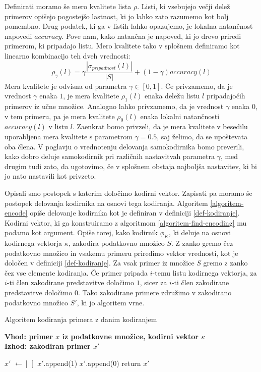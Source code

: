 \documentclass[12pt,a4paper,twoside]{article}
\theoremstyle{definition} %
\theoremstyle{plain} %
\numberwithin{equation}{section}  %
\begin{document}
Definirati moramo še mero kvalitete lista $\rho$. 
Listi, ki vsebujejo večji delež primerov opišejo pogostejšo lastnost, ki jo lahko zato razumemo kot bolj pomembno. 
Drug podatek, ki ga v listih lahko opazujemo, je lokalna natančnost napovedi $\mathit{accuracy}$.
Pove nam, kako natančna je napoved, ki jo drevo priredi primerom, ki pripadajo listu.
Mero kvalitete tako v splošnem definiramo kot linearno kombinacijo teh dveh vrednosti:
\[
\rho_{\gamma}(l) = \gamma \frac{|\sigma_{\mathit{pripadnost}}(l)|}{|S|} + (1-\gamma) \mathit{accuracy}(l)
\]
\label{mera-kvalitete}
Mera kvalitete je odvisna od parametra $\gamma \in [0,1]$.
Če privzamemo, da je vrednost $\gamma$ enaka $1$, je mera kvalitete $\rho_1(l)$ enaka deležu listu $l$ pripadajočih primerov iz učne množice.
Analogno lahko privzamemo, da je vrednost $\gamma$ enaka $0$, v tem primeru, pa je mera kvalitete $\rho_0(l)$ enaka lokalni natančnosti $\mathit{accuracy}(l)$ v listu $l$.
Zaenkrat bomo privzeli, da je mera kvalitete v besedilu uporabljena mera kvalitete s parametrom $\gamma=0.5$, saj želimo, da se upoštevata oba člena.
V poglavju o vrednotenju delovanja samokodirnika bomo preverili, kako dobro deluje samokodirnik pri različnih nastavitvah parametra $\gamma$,
med drugim tudi zato, da ugotovimo, če v splošnem obstaja najboljša nastavitev, ki bi jo nato nastavili kot privzeto.

Opisali smo postopek s katerim določimo kodirni vektor. Zapisati pa moramo še postopek delovanja kodirnika na osnovi tega kodiranja.
Algoritem \ref{algoritem-encode} opiše delovanje kodirnika kot je definiran v definiciji \ref{def-kodiranje}. 
Kodirni vektor, ki ga konstruiramo z algoritmom \ref{algoritem-find-encoding} mu podamo kot argument.
Opiše torej, kako kodirnik $\phi_K$, ki deluje na osnovi kodirnega vektorja $\kappa$, zakodira podatkovno množico $S$. 
Z zanko gremo čez podatkovno množico in vsakemu primeru priredimo vektor vrednosti, kot je določen v definiciji \ref{def-kodiranje}.
Za vsak primer iz množice $S$ gremo z zanko čez vse elemente kodiranja. 
Če primer pripada $i$-temu listu kodirnega vektorja, za $i$-ti člen zakodirane predstavitve določimo $1$, sicer za $i$-ti člen zakodirane predstavitve določimo $0$.
Tako zakodirane primere združimo v zakodirano podatkovno množico $S'$, ki jo algoritem vrne.

\begin{algorithm}[ht]
  \caption{Algoritem kodiranja primera z danim kodiranjem}
  \label{algoritem-encode}
  \raggedright
  \textbf{Vhod: primer $x$ iz podatkovne množice, kodirni vektor $\kappa$}  \\
  \textbf{Izhod: zakodiran primer $x'$} 
  \begin{algorithmic}[0]
	\State $x'$ $\gets [\ ]$
			\State $x'$.append($1$)
		\Else
			\State $x'$.append($0$)
		\EndIf
	\EndFor
	\State return $x'$
  \end{algorithmic}
\end{algorithm}
\end{document}
